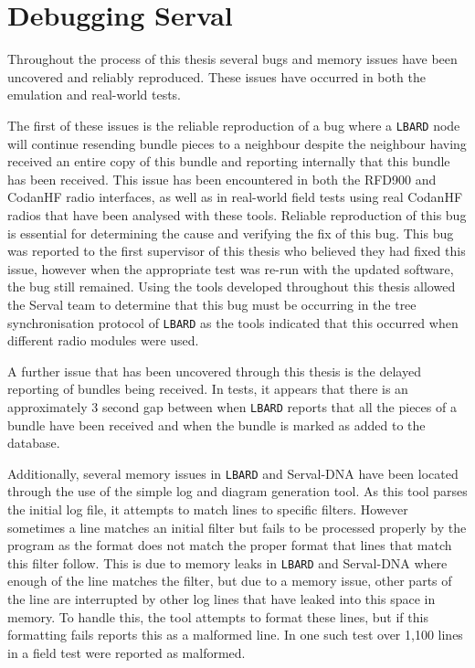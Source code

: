 \section{Debugging Serval}
Throughout the process of this thesis several bugs and memory issues have been uncovered and reliably reproduced.
These issues have occurred in both the emulation and real-world tests.

The first of these issues is the reliable reproduction of a bug where a \texttt{LBARD} node will continue resending bundle pieces to a neighbour despite the neighbour having received an entire copy of this bundle and reporting internally that this bundle has been received.
This issue has been encountered in both the RFD900 and CodanHF radio interfaces, as well as in real-world field tests using real CodanHF radios that have been analysed with these tools.
Reliable reproduction of this bug is essential for determining the cause and verifying the fix of this bug.
This bug was reported to the first supervisor of this thesis who believed they had fixed this issue, however when the appropriate test was re-run with the updated software, the bug still remained.
Using the tools developed throughout this thesis allowed the Serval team to determine that this bug must be occurring in the tree synchronisation protocol of \texttt{LBARD} as the tools indicated that this occurred when different radio modules were used.

A further issue that has been uncovered through this thesis is the delayed reporting of bundles being received.
In tests, it appears that there is an approximately 3 second gap between when \texttt{LBARD} reports that all the pieces of a bundle have been received and when the bundle is marked as added to the database.

Additionally, several memory issues in \texttt{LBARD} and Serval-DNA have been located through the use of the simple log and diagram generation tool.
As this tool parses the initial log file, it attempts to match lines to specific filters.
However sometimes a line matches an initial filter but fails to be processed properly by the program as the format does not match the proper format that lines that match this filter follow.
This is due to memory leaks in \texttt{LBARD} and Serval-DNA where enough of the line matches the filter, but due to a memory issue, other parts of the line are interrupted by other log lines that have leaked into this space in memory.
To handle this, the tool attempts to format these lines, but if this formatting fails reports this as a malformed line.
In one such test over 1,100 lines in a field test were reported as malformed.


